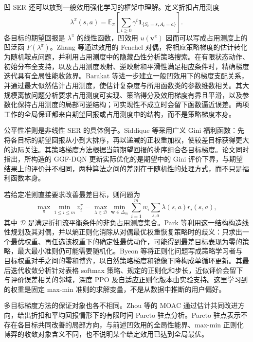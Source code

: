 凹 SER 还可以放到一般效用强化学习的框架中理解。定义折扣占用测度
\begin{equation}
\lambda^\pi(s,a)=\mathbb E_\pi\!\left[\sum_{t\geq0}\gamma^t\mathbf1_{\{S_t=s,A_t=a\}}\right].
\end{equation}
各目标的期望回报是 $\lambda^\pi$ 的线性函数，凹效用 $u(\mathbf v^\pi)$ 因而可以写成占用测度上的凹泛函 $F(\lambda^\pi)$。Zhang 等通过效用的 Fenchel 对偶，将相应策略梯度的估计转化为随机鞍点问题，并利用占用测度中的隐藏凸性分析策略搜索\cite{zhang2020general}。在有限状态动作、初始分布全支持，以及占用测度映射、逆映射和平滑性满足相应条件时，精确梯度迭代具有全局性能收敛界。Barakat 等进一步建立一般凹效用下的梯度支配关系，并通过最大似然估计占用测度，使估计复杂度与所用函数类的参数维数相关\cite{barakat2025general}。其大规模离散问题分析要求占用测度可实现、策略得分及效用梯度有界且平滑，以及参数化保持占用测度的局部可逆结构；可实现性不成立时会留下函数逼近误差。两项工作的全局保证都来自期望回报或占用测度中的结构，而不是策略梯度本身。

公平性准则是非线性 SER 的具体例子。Siddique 等采用广义 Gini 福利函数：先将各目标的期望回报从小到大排序，再以递减的正权重加权，使较差目标获得更大的边际关注\cite{siddique2020fair}。其策略梯度方法根据当前期望回报的排序组合各目标梯度。论文同时指出，所构造的 GGF-DQN 更新实际优化的是期望中的 Gini 评价下界，与期望结果上的评价并不相同，两种算法之间的差别在于随机性的处理方式，而不只是福利函数本身。

若给定准则直接要求改善最差目标，则问题为
\begin{equation}
\max_\pi\min_{1\leq i\leq m}v_i^\pi
=\max_{\lambda\in\mathcal D}\min_{\mathbf w\in\Delta_m}
\sum_{i=1}^m w_i\sum_{s,a}\lambda(s,a)r_i(s,a),
\end{equation}
其中 $\mathcal D$ 是满足折扣流平衡条件的非负占用测度集合。Park 等利用这一结构构造线性规划及其对偶，并以熵正则化消除从对偶最优权重恢复策略时的歧义\cite{park2024maxmin}：只求出一个最优权重、再任选该权重下的确定性最优动作，可能得到最差目标表现为零的策略，最大最小准则仍可能需要随机化。Byeon 等将正则化问题写成策略学习者与目标权重对手之间的零和博弈，以自然策略梯度和镜像下降构成单循环更新\cite{byeon2025maxmin}。其最后迭代收敛分析针对表格 softmax 策略、规定的正则化和步长，近似评价会留下与评价误差相关的邻域，深度 PPO 及自适应正则化版本由实验支持。这里学习到的权重是固定 max-min 准则的求解变量，不是从数据中推断的用户偏好。

多目标梯度方法的保证对象也各不相同。Zhou 等的 MOAC 通过估计共同改进方向，给出折扣和平均回报情形下的有限时间 Pareto 驻点分析\cite{zhou2024moac}。Pareto 驻点表示不存在各目标共同改善的局部方向，与前述凹效用的全局性能界、max-min 正则化博弈的收敛对象含义不同，也不说明某个给定效用已达到全局最优。

